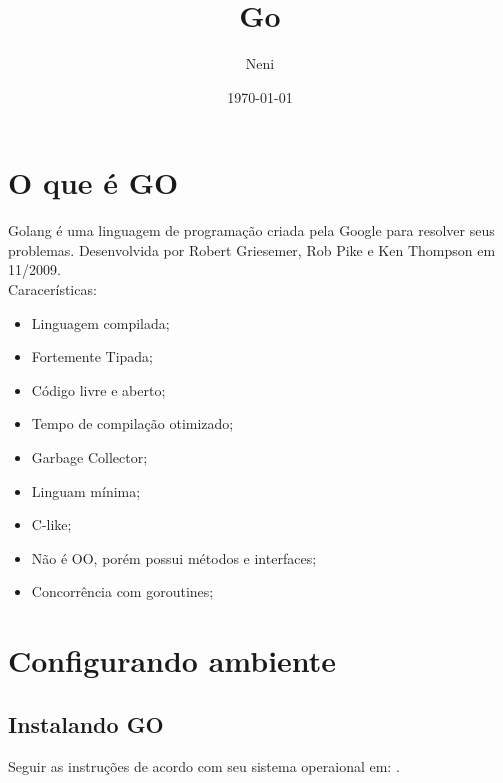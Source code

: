 \documentclass{apostila}
\title{Go}
\author{Neni}
\date{\today}
\begin{document}
\chapter{O que é GO}

Golang é uma linguagem de programação criada pela Google para resolver seus problemas\cite[1]{cod3r}. Desenvolvida por Robert Griesemer, Rob Pike e Ken Thompson em 11/2009\cite[4]{cod3r}.
\\
Caracerísticas:
\begin{itemize}
    \item Linguagem compilada\cite[1]{cod3r};
    \item Fortemente Tipada\cite[4]{cod3r};
    \item Código livre e aberto\cite[4]{cod3r};
    \item Tempo de compilação otimizado\cite[4]{cod3r};
    \item Garbage Collector\cite[4]{cod3r};
    \item Linguam mínima\cite[4]{cod3r};
    \item C-like\cite[4]{cod3r};
    \item Não é OO, porém possui métodos e interfaces\cite[4]{cod3r};
    \item Concorrência com goroutines\cite[4]{cod3r};
\end{itemize}










\chapter{Configurando ambiente}
\section{Instalando GO}
Seguir as instruções de acordo com seu sistema operaional em: .

\end{document}
